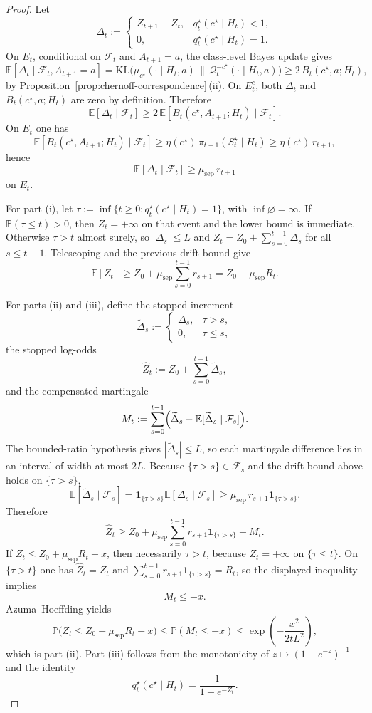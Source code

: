 \documentclass[11pt]{article}
\theoremstyle{definition}
\theoremstyle{remark}
\newcommand{\Qcal}{\mathcal{Q}}
\newcommand{\E}{\mathbb{E}}
\newcommand{\Prob}{\mathbb{P}}
\newcommand{\KL}{\mathrm{KL}}
\newcommand{\one}{\mathbf{1}}
\begin{document}
\begin{proof}
Let
\[
\Delta_t:=
\begin{cases}
Z_{t+1}-Z_t, & q_t^\star(c^\star\mid H_t)<1,\\
0, & q_t^\star(c^\star\mid H_t)=1.
\end{cases}
\]
On $E_t$, conditional on $\mathcal F_t$ and $A_{t+1}=a$, the class-level Bayes update gives
\[
\E[\Delta_t\mid\mathcal F_t,A_{t+1}=a]
=
\KL\!\bigl(\mu_{c^\star}(\cdot\mid H_t,a)\,\|\,\Qcal_t^{-c^\star}(\cdot\mid H_t,a)\bigr)
\ge 2\,B_t(c^\star,a;H_t),
\]
by Proposition~\ref{prop:chernoff-correspondence}\,\textup{(ii)}. On $E_t^c$, both $\Delta_t$ and $B_t(c^\star,a;H_t)$ are zero by definition. Therefore
\[
\E[\Delta_t\mid\mathcal F_t]\ge 2\,\E[B_t(c^\star,A_{t+1};H_t)\mid\mathcal F_t].
\]
On $E_t$ one has
\[
\E[B_t(c^\star,A_{t+1};H_t)\mid\mathcal F_t]
\ge
\eta(c^\star)\,\pi_{t+1}(S_t^\star\mid H_t)
\ge
\eta(c^\star)\,r_{t+1},
\]
hence
\[
\E[\Delta_t\mid\mathcal F_t]\ge \mu_{\mathrm{sep}}\,r_{t+1}
\]
on $E_t$.

For part \textup{(i)}, let $\tau:=\inf\{t\ge 0:q_t^\star(c^\star\mid H_t)=1\}$, with $\inf\varnothing=\infty$. If $\Prob(\tau\le t)>0$, then $Z_t=+\infty$ on that event and the lower bound is immediate. Otherwise $\tau>t$ almost surely, so $|\Delta_s|\le L$ and $Z_t=Z_0+\sum_{s=0}^{t-1}\Delta_s$ for all $s\le t-1$. Telescoping and the previous drift bound give
\[
\E[Z_t]\ge Z_0+\mu_{\mathrm{sep}}\sum_{s=0}^{t-1}r_{s+1}
=
Z_0+\mu_{\mathrm{sep}}R_t.
\]

For parts \textup{(ii)} and \textup{(iii)}, define the stopped increment
\[
\widetilde\Delta_s:=
\begin{cases}
\Delta_s, & \tau>s,\\
0, & \tau\le s,
\end{cases}
\]
the stopped log-odds
\[
\widehat Z_t:=Z_0+\sum_{s=0}^{t-1}\widetilde\Delta_s,
\]
and the compensated martingale
\[
M_t:=\sum_{s=0}^{t-1}\Bigl(\widetilde\Delta_s-\E[\widetilde\Delta_s\mid\mathcal F_s]\Bigr).
\]
The bounded-ratio hypothesis gives $|\widetilde\Delta_s|\le L$, so each martingale difference lies in an interval of width at most $2L$. Because $\{\tau>s\}\in\mathcal F_s$ and the drift bound above holds on $\{\tau>s\}$,
\[
\E[\widetilde\Delta_s\mid\mathcal F_s]
=
\one_{\{\tau>s\}}\E[\Delta_s\mid\mathcal F_s]
\ge
\mu_{\mathrm{sep}}\,r_{s+1}\one_{\{\tau>s\}}.
\]
Therefore
\[
\widehat Z_t
\ge
Z_0+\mu_{\mathrm{sep}}\sum_{s=0}^{t-1}r_{s+1}\one_{\{\tau>s\}}+M_t.
\]
If $Z_t\le Z_0+\mu_{\mathrm{sep}}R_t-x$, then necessarily $\tau>t$, because $Z_t=+\infty$ on $\{\tau\le t\}$. On $\{\tau>t\}$ one has $\widehat Z_t=Z_t$ and $\sum_{s=0}^{t-1}r_{s+1}\one_{\{\tau>s\}}=R_t$, so the displayed inequality implies
\[
M_t\le -x.
\]
Azuma--Hoeffding yields
\[
\Prob\!\bigl(Z_t\le Z_0+\mu_{\mathrm{sep}}R_t-x\bigr)
\le
\Prob(M_t\le -x)
\le
\exp\!\left(-\frac{x^2}{2tL^2}\right),
\]
which is part \textup{(ii)}. Part \textup{(iii)} follows from the monotonicity of $z\mapsto (1+e^{-z})^{-1}$ and the identity
\[
q_t^\star(c^\star\mid H_t)=\frac{1}{1+e^{-Z_t}}.
\]
\end{proof}
\end{document}
